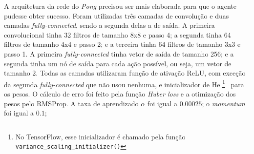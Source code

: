 A arquitetura da rede do \textit{Pong} precisou ser mais elaborada para que o agente pudesse obter sucesso.
Foram utilizadas três camadas de convolução e duas camadas \textit{fully-connected}, sendo a segunda delas a de saída.
A primeira convolucional tinha 32 filtros de tamanho 8x8 e passo 4; a segunda tinha 64 filtros de tamanho 4x4 e passo 2; e a terceira tinha 64 filtros de tamanho 3x3 e passo 1.
A primeira \textit{fully-connected} tinha vetor de saída de tamanho 256; e a segunda tinha um nó de saída para cada ação possível, ou seja, um vetor de tamanho 2.
Todas as camadas utilizaram função de ativação ReLU, com exceção da segunda \textit{fully-connected} que não usou nenhuma, e inicializador de He \footnote{No TensorFlow, esse inicializador é chamado pela função \texttt{variance\_scaling\_initializer()}}~\cite{DBLP:journals/corr/HeZR015} para os pesos.
O cálculo de erro foi feito pela função \textit{Huber loss} e a otimização dos pesos pelo RMSProp.
A taxa de aprendizado $\alpha$ foi igual a $0.00025$;
o \textit{momentum} foi igual a $0.1$;
